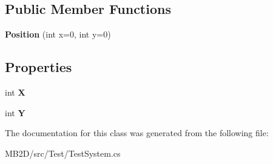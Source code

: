 \subsection*{Public Member Functions}
\begin{DoxyCompactItemize}
\item 
\hypertarget{class_m_b2_d_1_1_testing_1_1_position_a2a86f57b1c45aef25e72b684f804ddcb}{}\label{class_m_b2_d_1_1_testing_1_1_position_a2a86f57b1c45aef25e72b684f804ddcb} 
{\bfseries Position} (int x=0, int y=0)
\end{DoxyCompactItemize}
\subsection*{Properties}
\begin{DoxyCompactItemize}
\item 
\hypertarget{class_m_b2_d_1_1_testing_1_1_position_ac9f88258d930e34f99538602ff0d069c}{}\label{class_m_b2_d_1_1_testing_1_1_position_ac9f88258d930e34f99538602ff0d069c} 
int {\bfseries X}
\item 
\hypertarget{class_m_b2_d_1_1_testing_1_1_position_ad8e367dcc2f8743e051fd9f4b13f4160}{}\label{class_m_b2_d_1_1_testing_1_1_position_ad8e367dcc2f8743e051fd9f4b13f4160} 
int {\bfseries Y}
\end{DoxyCompactItemize}


The documentation for this class was generated from the following file\+:\begin{DoxyCompactItemize}
\item 
M\+B2\+D/src/\+Test/Test\+System.\+cs\end{DoxyCompactItemize}
